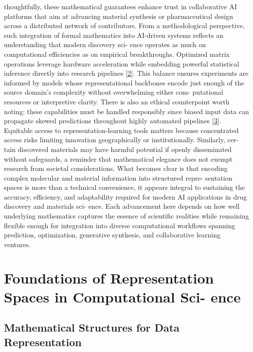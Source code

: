 \documentclass[
]{article}
\begin{document}
thoughtfully, these mathematical guarantees enhance trust in
collaborative AI platforms that aim at advancing material synthesis or
pharmaceutical design across a distributed network of contributors. From
a methodological perspective, such integration of formal mathematics
into AI-driven systems reflects an understanding that modern discovery
sci- ence operates as much on computational efficiencies as on empirical
breakthroughs. Optimized matrix operations leverage hardware
acceleration while embedding powerful statistical inference directly
into research pipelines {[}\hyperref[_bookmark42]{2}{]}. This balance
ensures experiments are informed by models whose representational
backbones encode just enough of the source domain's complexity without
overwhelming either com- putational resources or interpretive clarity.
There is also an ethical counterpoint worth noting: these capabilities
must be handled responsibly since biased input data can propagate skewed
predictions throughout highly automated pipelines
{[}\hyperref[_bookmark43]{3}{]}. Equitable access to
representation-learning tools matters because concentrated access risks
limiting innovation geographically or institutionally. Similarly, cer-
tain discovered materials may have harmful potential if openly
disseminated without safeguards, a reminder that mathematical elegance
does not exempt research from societal considerations. What becomes
clear is that encoding complex molecular and material information into
structured repre- sentation spaces is more than a technical convenience,
it appears integral to sustaining the accuracy, efficiency, and
adaptability required for modern AI applications in drug discovery and
materials sci- ence. Each advancement here depends on how well
underlying mathematics captures the essence of scientific realities
while remaining flexible enough for integration into diverse
computational workflows spanning prediction, optimization, generative
synthesis, and collaborative learning ventures.

\section{Foundations of Representation Spaces in Computational Sci-
ence}\label{foundations-of-representation-spaces-in-computational-sci--ence}

\subsection{Mathematical Structures for Data
Representation}\label{mathematical-structures-for-data-representation}
\end{document}
